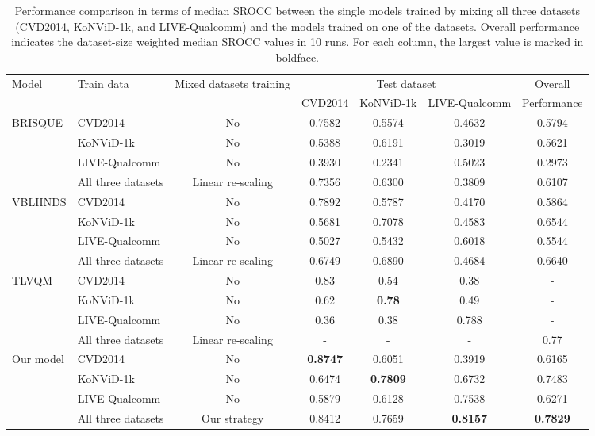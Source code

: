 \documentclass[twocolumn]{svjour3}          \smartqed  \usepackage{graphicx}
\begin{document}
\begin{table*}[!thb]
    \centering
    \caption{Performance comparison in terms of median SROCC between the single models trained by mixing all three datasets (CVD2014, KoNViD-1k, and LIVE-Qualcomm) and the models trained on one of the datasets. Overall performance indicates the dataset-size weighted median SROCC values in 10 runs. For each column, the largest value is marked in boldface.}
    \label{tab:vs individual}

    \begin{small}
    
\begin{tabular}{llccccc}
    \toprule
    \multirow{2}{*}{Model} & \multirow{2}{*}{Train data} & \multirow{2}{*}{Mixed datasets training} & \multicolumn{3}{c}{Test dataset} & Overall \\
    & & & CVD2014 & KoNViD-1k & LIVE-Qualcomm & Performance\\
    \midrule
    \multirow{4}{*}{BRISQUE} & CVD2014 & No & 0.7582 & 0.5574 & 0.4632 & 0.5794   \\
    & KoNViD-1k & No & 0.5388 & 0.6191 & 0.3019 & 0.5621   \\
    & LIVE-Qualcomm & No & 0.3930 & 0.2341 & 0.5023 & 0.2973   \\ 
    & All three datasets & Linear re-scaling & 0.7356 & 0.6300 & 0.3809 & 0.6107  \\ 
    \midrule
    \multirow{4}{*}{VBLIINDS} & CVD2014 & No &  0.7892 & 0.5787 & 0.4170 & 0.5864 \\
    & KoNViD-1k & No &  0.5681 & 0.7078 & 0.4583 & 0.6544   \\
    & LIVE-Qualcomm & No &  0.5027 & 0.5432 & 0.6018 & 0.5544   \\ 
    & All three datasets & Linear re-scaling &  0.6749 & 0.6890 & 0.4684 & 0.6640   \\ 
    \midrule
    \multirow{4}{*}{TLVQM} & CVD2014 & No &  0.83 & 0.54 & 0.38 & - \\
    & KoNViD-1k & No &  0.62 & \textbf{0.78} & 0.49 &  -  \\
    & LIVE-Qualcomm & No & 0.36 & 0.38 & 0.788 &  -  \\ 
    & All three datasets & Linear re-scaling &  - & - & - & 0.77   \\ 
    \midrule
    \multirow{4}{*}{Our model} & CVD2014 & No &  \textbf{0.8747} & 0.6051 & 0.3919 & 0.6165   \\
    & KoNViD-1k & No &  0.6474 & \textbf{0.7809} & 0.6732 & 0.7483   \\
    & LIVE-Qualcomm & No &  0.5879 & 0.6128 & 0.7538 & 0.6271  \\ 
    & All three datasets & Our strategy & 0.8412 & 0.7659 & \textbf{0.8157} & \textbf{0.7829}  \\ 
    \bottomrule
    \end{tabular}



\end{small}
\end{table*}
\end{document}
